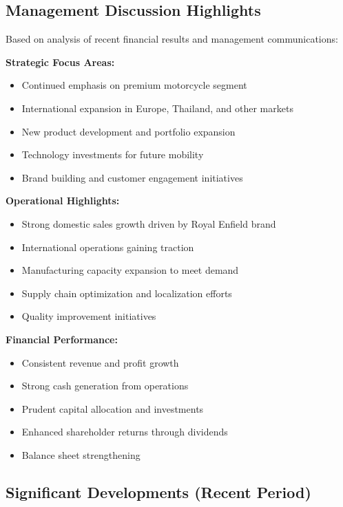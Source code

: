 \documentclass[8pt,a4paper]{article}
\begin{document}
\subsection{Management Discussion Highlights}

Based on analysis of recent financial results and management communications:

\textbf{Strategic Focus Areas:}
\begin{itemize}
    \item Continued emphasis on premium motorcycle segment
    \item International expansion in Europe, Thailand, and other markets
    \item New product development and portfolio expansion
    \item Technology investments for future mobility
    \item Brand building and customer engagement initiatives
\end{itemize}

\textbf{Operational Highlights:}
\begin{itemize}
    \item Strong domestic sales growth driven by Royal Enfield brand
    \item International operations gaining traction
    \item Manufacturing capacity expansion to meet demand
    \item Supply chain optimization and localization efforts
    \item Quality improvement initiatives
\end{itemize}

\textbf{Financial Performance:}
\begin{itemize}
    \item Consistent revenue and profit growth
    \item Strong cash generation from operations
    \item Prudent capital allocation and investments
    \item Enhanced shareholder returns through dividends
    \item Balance sheet strengthening
\end{itemize}

\subsection{Significant Developments (Recent Period)}
\end{document}
